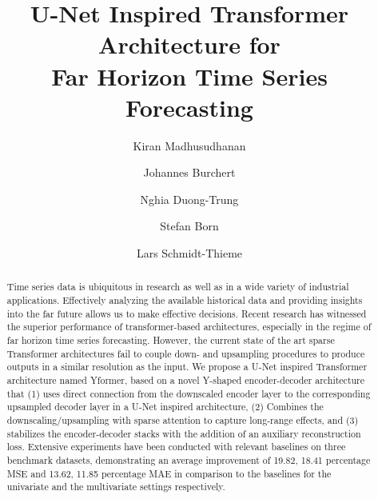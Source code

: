 \documentclass[runningheads]{llncs}
\begin{document}
%

\title{U-Net Inspired Transformer Architecture for \\Far Horizon Time Series Forecasting}

%
%

\author{Kiran Madhusudhanan\Letter \and
Johannes Burchert  \and
Nghia Duong-Trung \and
Stefan Born  \and
Lars Schmidt-Thieme  
}
%


\maketitle              %
%
\begin{abstract}
Time series data is ubiquitous in research as well as in a wide variety of industrial applications. Effectively analyzing the available historical data and providing insights into the far future allows us to make effective decisions. Recent research has witnessed the superior performance of transformer-based architectures, especially in the regime of far horizon time series forecasting. However, the current state of the art sparse Transformer architectures fail to couple down- and upsampling procedures to produce outputs in a similar resolution as the input. We propose a U-Net inspired Transformer architecture named Yformer, based on a novel Y-shaped encoder-decoder architecture that (1) uses direct connection from the downscaled encoder layer to the corresponding upsampled decoder layer in a U-Net inspired architecture, (2) Combines the downscaling/upsampling with sparse attention to capture long-range effects, and (3) stabilizes the encoder-decoder stacks with the addition of an auxiliary reconstruction loss. Extensive experiments have been conducted with relevant baselines on three benchmark datasets, demonstrating an average improvement of 19.82, 18.41 percentage MSE and 13.62, 11.85 percentage MAE in comparison to the baselines for the univariate and the multivariate settings respectively.

\end{abstract}
\end{document}
